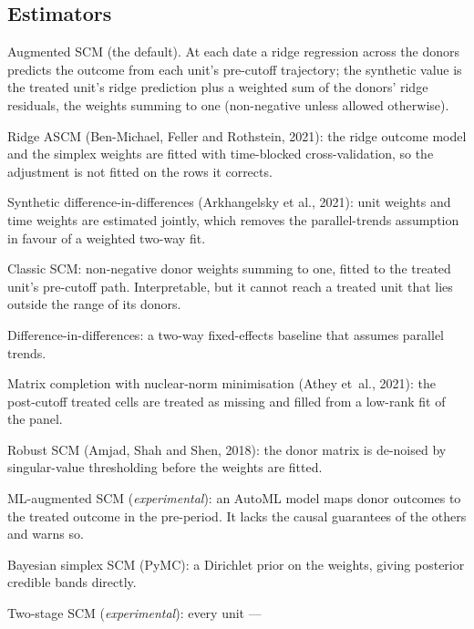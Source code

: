 \documentclass[11pt]{report}
\newcommand{\nosep}{\setlength{\itemsep}{0pt}\setlength{\parskip}{0pt}\setlength{\topsep}{2pt}}
\newcommand{\codeunderscore}{\textunderscore\allowbreak}
\newcommand{\code}[1]{\texttt{\let\_\codeunderscore #1}}
\begin{document}
\subsection{Estimators}
\begin{description}\nosep
  \item[\code{scm}] Augmented SCM (the default). At each date a ridge regression across
        the donors predicts the outcome from each unit's pre-cutoff trajectory; the
        synthetic value is the treated unit's ridge prediction plus a weighted sum of the
        donors' ridge residuals, the weights summing to one (non-negative unless allowed
        otherwise).
  \item[\code{ascm}] Ridge ASCM (Ben-Michael, Feller and Rothstein, 2021): the ridge
        outcome model and the simplex weights are fitted with time-blocked
        cross-validation, so the adjustment is not fitted on the rows it corrects.
  \item[\code{sdid}] Synthetic difference-in-differences (Arkhangelsky et al., 2021):
        unit weights and time weights are estimated jointly, which removes the
        parallel-trends assumption in favour of a weighted two-way fit.
  \item[\code{abadie}] Classic SCM: non-negative donor weights summing to one, fitted to
        the treated unit's pre-cutoff path. Interpretable, but it cannot reach a treated
        unit that lies outside the range of its donors.
  \item[\code{did}] Difference-in-differences: a two-way fixed-effects baseline that
        assumes parallel trends.
  \item[\code{mcnnm}] Matrix completion with nuclear-norm minimisation (Athey et~al.,
        2021): the post-cutoff treated cells are treated as missing and filled from a
        low-rank fit of the panel.
  \item[\code{robust}] Robust SCM (Amjad, Shah and Shen, 2018): the donor matrix is
        de-noised by singular-value thresholding before the weights are fitted.
  \item[\code{mlscm}] ML-augmented SCM (\emph{experimental}): an AutoML model maps donor
        outcomes to the treated outcome in the pre-period. It lacks the causal
        guarantees of the others and warns so.
  \item[\code{bayesian}] Bayesian simplex SCM (PyMC): a Dirichlet prior on the weights,
        giving posterior credible bands directly.
  \item[\code{deweathered}] Two-stage SCM (\emph{experimental}): every unit ---

\end{description}
\end{document}
